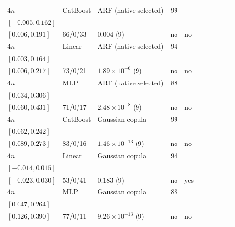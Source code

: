 \begin{longtable}{@{}ll>{\raggedright\arraybackslash}p{1.1in}rllrlll@{}}
$4n$ & CatBoost & ARF (native selected) & 99 & \begin{tabular}[t]{@{}l@{}}$0.051$\\\tiny$[-0.005, 0.162]$\end{tabular} & \begin{tabular}[t]{@{}l@{}}$0.083$\\\tiny$[0.006, 0.191]$\end{tabular} & 66/0/33 & $0.004$ (9) & no & no \\
$4n$ & Linear & ARF (native selected) & 94 & \begin{tabular}[t]{@{}l@{}}$0.073$\\\tiny$[0.003, 0.164]$\end{tabular} & \begin{tabular}[t]{@{}l@{}}$0.083$\\\tiny$[0.006, 0.217]$\end{tabular} & 73/0/21 & $1.89\times 10^{-6}$ (9) & no & no \\
$4n$ & MLP & ARF (native selected) & 88 & \begin{tabular}[t]{@{}l@{}}$0.106$\\\tiny$[0.034, 0.306]$\end{tabular} & \begin{tabular}[t]{@{}l@{}}$0.191$\\\tiny$[0.060, 0.431]$\end{tabular} & 71/0/17 & $2.48\times 10^{-8}$ (9) & no & no \\
$4n$ & CatBoost & Gaussian copula & 99 & \begin{tabular}[t]{@{}l@{}}$0.164$\\\tiny$[0.062, 0.242]$\end{tabular} & \begin{tabular}[t]{@{}l@{}}$0.191$\\\tiny$[0.089, 0.273]$\end{tabular} & 83/0/16 & $1.46\times 10^{-13}$ (9) & no & no \\
$4n$ & Linear & Gaussian copula & 94 & \begin{tabular}[t]{@{}l@{}}$0.002$\\\tiny$[-0.014, 0.015]$\end{tabular} & \begin{tabular}[t]{@{}l@{}}$0.007$\\\tiny$[-0.023, 0.030]$\end{tabular} & 53/0/41 & $0.183$ (9) & no & yes \\
$4n$ & MLP & Gaussian copula & 88 & \begin{tabular}[t]{@{}l@{}}$0.170$\\\tiny$[0.047, 0.264]$\end{tabular} & \begin{tabular}[t]{@{}l@{}}$0.234$\\\tiny$[0.126, 0.390]$\end{tabular} & 77/0/11 & $9.26\times 10^{-13}$ (9) & no & no \\

\end{longtable}
